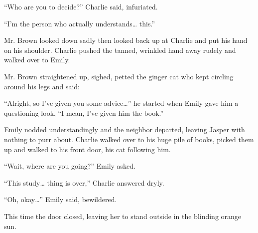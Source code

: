 “Who are you to decide?” Charlie said, infuriated.

“I'm the person who actually understands… this.”

Mr. Brown looked down sadly then looked back up at Charlie and put his hand on his shoulder. Charlie pushed the tanned, wrinkled hand away rudely and walked over to Emily.

Mr. Brown straightened up, sighed, petted the ginger cat who kept circling around his legs and said:

“Alright, so I've given you some advice…” he started when Emily gave him a questioning look, “I mean, I've given him the book.”

Emily nodded understandingly and the neighbor departed, leaving Jasper with nothing to purr about. Charlie walked over to his huge pile of books, picked them up and walked to his front door, his cat following him.

“Wait, where are you going?” Emily asked.

“This study… thing is over,” Charlie answered dryly.

“Oh, okay…” Emily said, bewildered.

This time the door closed, leaving her to stand outside in the blinding orange sun.